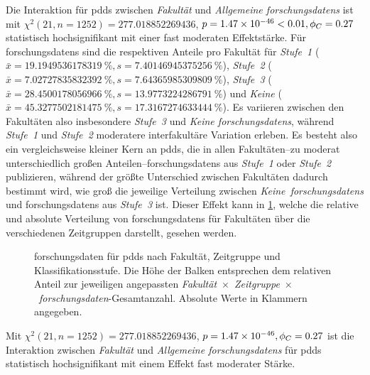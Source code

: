 Die Interaktion für \glspl{pdd} zwischen \textit{Fakultät} und \textit{Allgemeine \glspl{forschungsdaten}} ist mit $\chi^2 (\num{21}, n=\num{1252}) = \num[round-mode=places,round-precision=2]{277.018852269436}$, $p = \num[round-mode=places,round-precision=2]{1.46707274481795E-46}<\num{0.01},\phi_C=\num[round-mode=places,round-precision=2]{0.271576302422829}$ statistisch hochsignifikant mit einer fast moderaten Effektstärke.
Für \glspl{forschungsdaten} sind die respektiven Anteile pro Fakultät für \textit{Stufe~1} ($\bar{x}=\SI[round-mode=places,round-precision=2]{19.1949536178319}{\percent},s=\SI[round-mode=places,round-precision=2]{7.40146945375256}{\percent}$), \textit{Stufe~2} ($\bar{x}=\SI[round-mode=places,round-precision=2]{7.02727835832392}{\percent},s=\SI[round-mode=places,round-precision=2]{7.64365985309809}{\percent}$), \textit{Stufe~3} ($\bar{x}=\SI[round-mode=places,round-precision=2]{28.4500178056966}{\percent},s=\SI[round-mode=places,round-precision=2]{13.9773224286791}{\percent}$) und \textit{Keine} ($\bar{x}=\SI[round-mode=places,round-precision=2]{45.3277502181475}{\percent},s=\SI[round-mode=places,round-precision=2]{17.3167274633444}{\percent}$).
Es variieren zwischen den Fakultäten also insbesondere \textit{Stufe~3} und \textit{Keine \glspl{forschungsdaten}}, während \textit{Stufe~1} und \textit{Stufe~2} moderatere interfakultäre Variation erleben.
Es besteht also ein vergleichsweise kleiner Kern an \glspl{pdd}, die in allen Fakultäten--zu moderat unterschiedlich großen Anteilen--\glspl{forschungsdaten} aus \textit{Stufe~1} oder \textit{Stufe~2} publizieren, während der größte Unterschied zwischen Fakultäten dadurch bestimmt wird, wie groß die jeweilige Verteilung zwischen \textit{Keine~\glspl{forschungsdaten}} und \glspl{forschungsdaten} aus \textit{Stufe~3} ist.
Dieser Effekt kann in \cref{fig:luh-repo_fakultät_x_zeitgruppe_x_fd}, welche die relative und absolute Verteilung von \glspl{forschungsdaten} für Fakultäten über die verschiedenen Zeitgruppen darstellt, gesehen werden.
\begin{figure}[!htbp]
    \resizebox{\ifdim\width>\textwidth\textwidth\else\width\fi}{!}{}
    \caption{\gls{forschungsdaten} für \glspl{pdd} nach Fakultät, Zeitgruppe und Klassifikationsstufe.
    Die Höhe der Balken entsprechen dem relativen Anteil zur jeweiligen angepassten \textit{Fakultät}~$\times$~\textit{Zeitgruppe}~$\times$~\textit{\gls{forschungsdaten}}-Gesamtanzahl.
    Absolute Werte in Klammern angegeben.}
    \label{fig:luh-repo_fakultät_x_zeitgruppe_x_fd}
\end{figure}
Mit $\chi^2 (\num{21}, n=\num{1252}) = \num[round-mode=places,round-precision=2]{277.018852269436}$, $p = \num[round-mode=places,round-precision=2]{1.46707274481795E-46},\phi_C=\num[round-mode=places,round-precision=2]{0.271576302422829}$ ist die Interaktion zwischen \textit{Fakultät} und \textit{Allgemeine \glspl{forschungsdaten}} für \glspl{pdd} statistisch hochsignifikant mit einem Effekt fast moderater Stärke.

